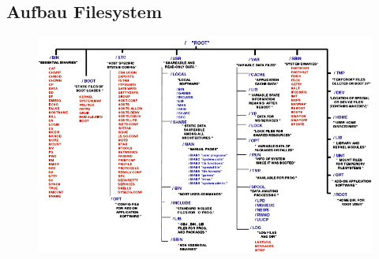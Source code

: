 \documentclass[xcolor=dvipsnames,aspectratio=169]{beamer}
\begin{document}
\subsection{Aufbau Filesystem}
\begin{frame}
\begin{figure}
  \vspace*{-0.3cm}
\includegraphics[scale=0.4]{filesystem}
\end{figure}
\end{frame}
\end{document}
